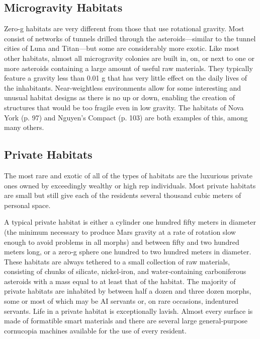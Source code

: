 \subsection{Microgravity Habitats}

Zero-g habitats are very different from those that 
use rotational gravity. Most consist of networks of 
tunnels drilled through the asteroids—similar to the 
tunnel cities of Luna and Titan—but some are considerably more exotic. Like most other habitats, almost 
all microgravity colonies are built in, on, or next to 
one or more asteroids containing a large amount of 
useful raw materials. They typically feature a gravity 
less than 0.01 g that has very little effect on the daily 
lives of the inhabitants. Near-weightless environments 
allow for some interesting and unusual habitat designs 
as there is no up or down, enabling the creation of 
structures that would be too fragile even in low gravity. The habitats of Nova York (p. 97) and Nguyen's 
Compact (p. 103) are both examples of this, among 
many others.

\subsection{Private Habitats}

The most rare and exotic of all of the types of habitats 
are the luxurious private ones owned by exceedingly 
wealthy or high rep individuals. Most private habitats 
are small but still give each of the residents several 
thousand cubic meters of personal space.

A typical private habitat is either a cylinder one 
hundred fifty meters in diameter (the minimum necessary to produce Mars gravity at a rate of rotation 
slow enough to avoid problems in all morphs) and 
between fifty and two hundred meters long, or a 
zero-g sphere one hundred to two hundred meters 
in diameter. These habitats are always tethered to 
a small collection of raw materials, consisting of 
chunks of silicate, nickel-iron, and water-containing 
carboniferous asteroids with a mass equal to at 
least that of the habitat. The majority of private 
habitats are inhabited by between half a dozen and 
three dozen morphs, some or most of which may 
be AI servants or, on rare occasions, indentured 
servants. Life in a private habitat is exceptionally 
lavish. Almost every surface is made of formatible 
smart materials and there are several large general-purpose cornucopia machines available for the use 
of every resident.

